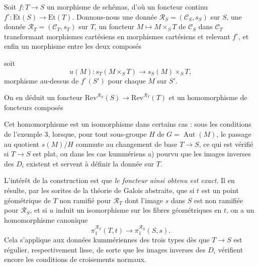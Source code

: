 \documentclass[11pt,a4paper]{article}
\begin{document}
Soit $f : T \to S$ un morphisme de schémas, d'où un foncteur continu
$f^{\circ} : \mathrm{Et}(S) \to \mathrm{Et}(T)$. Donnons-nous une donnée
$\mathcal{R}_{S} = (\mathcal{C}_{S}, s_{S})$ sur $S$, une donnée
$\mathcal{R}_{T} = (\mathcal{C}_{T}, s_{T})$ sur $T$, un foncteur
$M \mapsto M \times_{S} T$ de $\mathcal{C}_{S}$ dans $\mathcal{C}_{T}$
transformant morphismes cartésiens en morphismes cartésiens et relevant
$f^{\circ}$, et enfin un morphisme entre les deux composés


soit
\[
  u(M) : s_{T}(M \times_{S} T) \longrightarrow s_{S}(M) \times_{S} T ,
\]
morphisme au-dessus de $f^{\circ}(S')$ pour chaque $M$ sur $S'$.

On en déduit un foncteur
$\mathrm{Rev}^{\mathcal{R}_{S}}(S) \to \mathrm{Rev}^{\mathcal{R}_{T}}(T)$ et un
homomorphisme de foncteurs composés


Cet homomorphisme est un isomorphisme dans certains cas : sous les conditions
de l'exemple 3, lorsque, pour tout sous-groupe $H$ de
$G = \operatorname{Aut}(M)$, le passage au quotient $s(M)/H$ commute au
changement de base $T \to S$, ce qui est vérifié si $T \to S$ est plat, ou
dans les cas kummériens a) pourvu que les images inverses des $D_{i}$ existent
et servent à définir la donnée sur $T$.

L'intérêt de la construction est que \emph{le foncteur ainsi obtenu est exact}.
Il en résulte, par les sorites de la théorie de Galois abstraite, que si $t$
est un point géométrique de $T$ non ramifié pour $\mathcal{R}_{T}$ dont l'image
$s$ dans $S$ est non ramifiée pour $\mathcal{R}_{S}$, et si $u$ induit un
isomorphisme sur les fibres géométriques en $t$, on a un homomorphisme
canonique
\[
  \pi_{1}^{\mathcal{R}_{T}}(T, t) \longrightarrow
  \pi_{1}^{\mathcal{R}_{S}}(S, s) .
\]
Cela s'applique aux données kummériennes des trois types dès que $T \to S$ est
régulier, respectivement lisse, de sorte que les images inverses des $D_{i}$
vérifient encore les conditions de croisements normaux.
\end{document}
